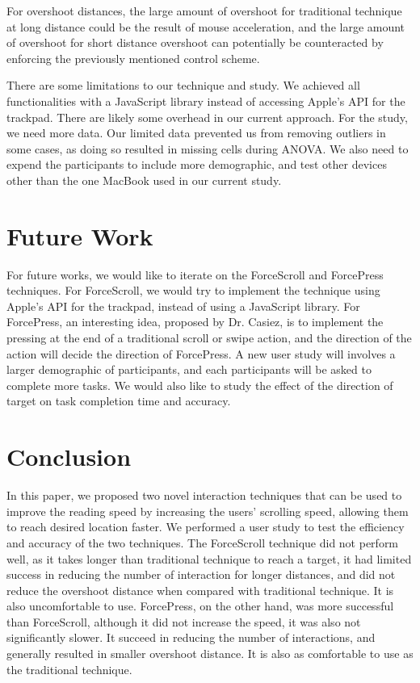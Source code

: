 \documentclass{sigchi}
\begin{document}
For overshoot distances, the large amount of overshoot for traditional technique at long distance could be the result of mouse acceleration, and the large amount of overshoot for short distance overshoot can potentially be counteracted by enforcing the previously mentioned control scheme.

There are some limitations to our technique and study. We achieved all functionalities with a JavaScript library instead of accessing Apple's API for the trackpad. There are likely some overhead in our current approach. For the study, we need more data. Our limited data prevented us from removing outliers in some cases, as doing so resulted in missing cells during ANOVA. We also need to expend the participants to include more demographic, and test other devices other than the one MacBook used in our current study.  
\section{Future Work}
For future works, we would like to iterate on the ForceScroll and ForcePress techniques. For ForceScroll, we would try to implement the technique using Apple's API for the trackpad, instead of using a JavaScript library. For ForcePress, an interesting idea, proposed by Dr. Casiez, is to implement the pressing at the end of a traditional scroll or swipe action, and the direction of the action will decide the direction of ForcePress. A new user study will involves a larger demographic of participants, and each participants will be asked to complete more tasks. We would also like to study the effect of the direction of target on task completion time and accuracy.  

    
\section{Conclusion}
In this paper, we proposed two novel interaction techniques that can be used to improve the reading speed by increasing the users' scrolling speed, allowing them to reach desired location faster. We performed a user study to test the efficiency and accuracy of the two techniques. The ForceScroll technique did not perform well, as it takes longer than traditional technique to reach a target, it had limited success in reducing the number of interaction for longer distances, and did not reduce the overshoot distance when compared with traditional technique. It is also uncomfortable to use. ForcePress, on the other hand, was more successful than ForceScroll, although it did not increase the speed, it was also not significantly slower. It succeed in reducing the number of interactions, and generally resulted in smaller overshoot distance. It is also as comfortable to use as the traditional technique.      
\end{document}
